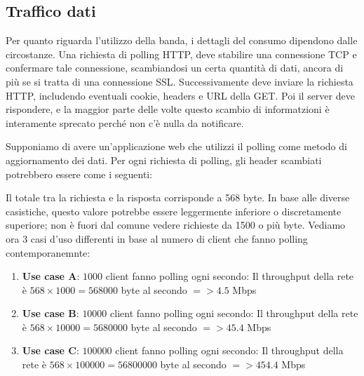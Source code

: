 \documentclass[12pt,a4paper,openright,twoside]{report}
\begin{document}
\subsection{Traffico dati}

Per quanto riguarda l'utilizzo della banda, i dettagli del consumo dipendono dalle circostanze. Una richiesta di polling HTTP, deve stabilire una connessione TCP e confermare tale connessione, scambiandosi un certa quantità di dati, ancora di più se si tratta di una connessione SSL. Successivamente deve inviare la richiesta HTTP, includendo eventuali cookie, headers e URL della GET. Poi il server deve rispondere, e la maggior parte delle volte questo scambio di informatzioni è interamente sprecato perché non c'è nulla da notificare.

\bigskip

Supponiamo di avere un'applicazione web che utilizzi il polling come metodo di aggiornamento dei dati. Per ogni richiesta di polling, gli header scambiati potrebbero essere come i seguenti:

Il totale tra la richiesta e la risposta corrisponde a 568 byte. In base alle diverse casistiche, questo valore potrebbe essere leggermente inferiore o discretamente superiore; non è fuori dal comune vedere richieste da 1500 o più byte.
Vediamo ora 3 casi d'uso differenti in base al numero di client che fanno polling contemporanemnte:
\begin{enumerate}
\item \textbf{Use case A}: $1000$ client fanno polling ogni secondo: Il throughput della rete è $568 \times 1000 = 568000$ byte al secondo $=> 4.5$ Mbps
\item \textbf{Use case B}: $10000$ client fanno polling ogni secondo: Il throughput della rete è $568 \times 10000 = 5680000$ byte al secondo $=> 45.4$ Mbps
\item \textbf{Use case C}: $100000$ client fanno polling ogni secondo: Il throughput della rete è $568 \times 100000 = 56800000$ byte al secondo $=> 454.4$ Mbps
\end{enumerate}
\end{document}
